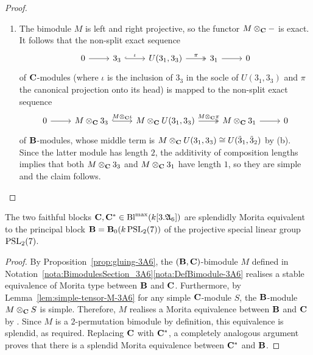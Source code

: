 \begin{proof}
\begin{enumerate}[label={\rm(\alph*)}]
    \[
            \chi^{}_{\widehat{P(\tilde{3}_1)}}=\chi^{}_{2}+\chi^{}_{4}+\chi^{}_{5}\qquad\text{ and }\qquad \chi^{}_{\widehat{P(\tilde{3}_2)}}=\chi^{}_{3}+\chi^{}_{4}+\chi^{}_{5}\,,
    \]
    proving that $\mathcal{P}\cong 0$. \\
    \item  
    The bimodule $M$ is left and right projective, so the functor $M\otimes_{{\mathbf{C}}}-$ is exact. It follows that the non-split exact sequence 
    \[
        \begin{tikzcd}
            0 \arrow[r]
             & 3_3 \arrow[r, hook, "\iota"]
             & U(3_1,3_3) \arrow[r, two heads, "\pi"]
             & 3_1 \arrow[r]
             & 0
        \end{tikzcd}
    \]
    of ${\mathbf{C}}$-modules 
    (where $\iota$ is the inclusion of $3_3$ in the socle of $U(3_1,3_3)$ and $\pi$ the canonical projection onto its head)
    is mapped to the non-split exact sequence 
    \[
        \begin{tikzcd}
            0 \arrow[r]
             & M\otimes_{\bC}3_3 \arrow[r, hook, "M\otimes_{\bC}\iota"]
             & M\otimes_{\bC}U(3_1,3_3) \arrow[r, two heads, "M\otimes_{\bC}\pi"]
             & M\otimes_{\bC}3_1 \arrow[r]
             & 0
        \end{tikzcd}
    \]
    of ${\mathbf{B}}$-modules,  
    whose middle term is $M\otimes_{{\mathbf{C}}}U(3_1,3_3)\cong U(\tilde{3}_1,\tilde{3}_2)$ by (b).
    Since the latter module has length $2$, the 
    additivity of composition lengths implies that both $M\otimes_{{\mathbf{C}}}3_3$ and $M\otimes_{{\mathbf{C}}}3_1$ have length $1$, so they are simple and the claim follows. 
\end{enumerate}
\end{proof}


\begin{thm}\label{thm:FaithfulBlocks3A6}%
    The two faithful blocks ${\mathbf{C}},{\mathbf{C}}^\ast\in\operatorname{Bl}^{\mathrm{max}}(k[3.{\mathfrak{A}}_6])$ are splendidly Morita equivalent to the principal block ${\mathbf{B}}={\mathbf{B}}_0(k\operatorname{PSL}_2(7))$ of the projective special linear group $\operatorname{PSL}_2(7)$.
\end{thm}

\begin{proof}
By Proposition~\ref{prop:gluing-3A6}, the $({\mathbf{B}},{\mathbf{C}})$-bimodule $M$ defined in Notation~\ref{nota:BimodulesSection_3A6}{\rm\ref{nota:DefBimodule-3A6}} realises a stable equivalence of Morita type between ${\mathbf{B}}$ and ${\mathbf{C}}$. Furthermore, by Lemma~\ref{lem:simple-tensor-M-3A6}
for any simple ${\mathbf{C}}$-module $S$, the ${\mathbf{B}}$-module $M\otimes_{{\mathbf{C}}}S$ is simple.  Therefore, $M$ realises a Morita equivalence between ${\mathbf{B}}$ and ${\mathbf{C}}$ by \cite[Theorem~2.1(iii)]{Lin96StableEqs}.
    Since  $M$ is a  $2$-permutation bimodule by definition, this equivalence is splendid, as required. Replacing ${\mathbf{C}}$ with ${\mathbf{C}}^\ast$, a completely analogous argument proves that there is a splendid Morita equivalence between ${\mathbf{C}}^{\ast}$ and ${\mathbf{B}}$. 
\end{proof}






